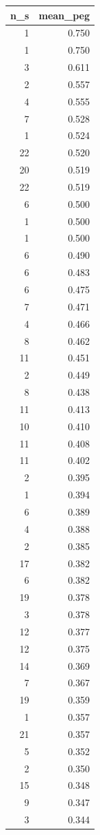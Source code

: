\begin{tabular}{rr}
\toprule
n_s & mean_peg \\
\midrule
1 & 0.750 \\
1 & 0.750 \\
3 & 0.611 \\
2 & 0.557 \\
4 & 0.555 \\
7 & 0.528 \\
1 & 0.524 \\
22 & 0.520 \\
20 & 0.519 \\
22 & 0.519 \\
6 & 0.500 \\
1 & 0.500 \\
1 & 0.500 \\
6 & 0.490 \\
6 & 0.483 \\
6 & 0.475 \\
7 & 0.471 \\
4 & 0.466 \\
8 & 0.462 \\
11 & 0.451 \\
2 & 0.449 \\
8 & 0.438 \\
11 & 0.413 \\
10 & 0.410 \\
11 & 0.408 \\
11 & 0.402 \\
2 & 0.395 \\
1 & 0.394 \\
6 & 0.389 \\
4 & 0.388 \\
2 & 0.385 \\
17 & 0.382 \\
6 & 0.382 \\
19 & 0.378 \\
3 & 0.378 \\
12 & 0.377 \\
12 & 0.375 \\
14 & 0.369 \\
7 & 0.367 \\
19 & 0.359 \\
1 & 0.357 \\
21 & 0.357 \\
5 & 0.352 \\
2 & 0.350 \\
15 & 0.348 \\
9 & 0.347 \\
3 & 0.344 \\

\end{tabular}
